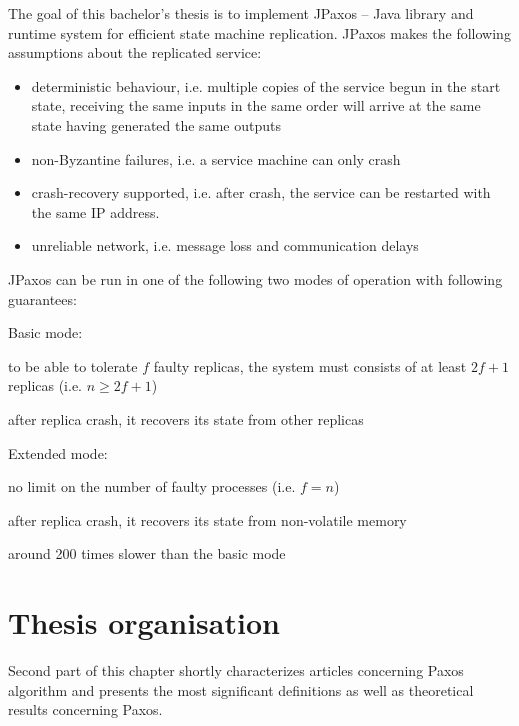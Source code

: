 
The goal of this bachelor's thesis is to implement JPaxos -- Java library and runtime system for efficient state machine replication. JPaxos makes the following assumptions about the replicated service:
\begin{itemize}
  \item {} deterministic behaviour, i.e. multiple copies of the service begun in the start state, receiving the same inputs in the same order will arrive at the same state having generated the same outputs
  \item {} non-Byzantine failures, i.e. a service machine can only crash
  \item {} crash-recovery supported, i.e. after crash, the service can be restarted with the same IP address.
  \item {} unreliable network, i.e. message loss and communication delays
\end{itemize}

JPaxos can be run in one of the following two modes of operation with following guarantees:

Basic mode:
\begin{tightList}
  \item [\textbullet] to be able to tolerate $f$ faulty replicas, the system must consists of at least $2f + 1$ replicas (i.e. $n \ge 2f + 1$)
  \item [\textbullet] after replica crash, it recovers its state from other replicas
\end{tightList}

Extended mode:
\begin{tightList}
  \item [\textbullet] no limit on the number of faulty processes (i.e. $f = n$)
  \item [\textbullet] after replica crash, it recovers its state from non-volatile memory
  \item [\textbullet] around 200 times slower than the basic mode
\end{tightList}

\section{Thesis organisation}


Second part of this chapter %
shortly characterizes articles concerning Paxos algorithm and presents the most significant definitions as well as theoretical results concerning Paxos.

